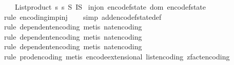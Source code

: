 \begin{isabellebody}
\ \ \ \ {\isacharparenleft}{\kern0pt}List{\isachardot}{\kern0pt}product\ {\isacharbrackleft}{\kern0pt}{}{\isachardot}{\kern0pt}{\isachardot}{\kern0pt}{\isacharless}{\kern0pt}s\ {\isacharbrackleft}{\kern0pt}{}{\isachardot}{\kern0pt}{\isachardot}{\kern0pt}{\isacharless}{\kern0pt}s\ {\isasymrightarrow}\isactrlsub S\ I\isactrlsub S{\isacharparenright}{\kern0pt}{\isacharparenright}{\kern0pt}{\isacharparenright}{\kern0pt}{\isacharparenright}{\kern0pt}{\isachardoublequoteclose}\isanewline
\isanewline
{}\isamarkupfalse%
\ {\isachardoublequoteopen}inj{\isacharunderscore}{\kern0pt}on\ encode{\isacharunderscore}{\kern0pt}f{}{\isacharunderscore}{\kern0pt}state\ {\isacharparenleft}{\kern0pt}dom\ encode{\isacharunderscore}{\kern0pt}f{}{\isacharunderscore}{\kern0pt}state{\isacharparenright}{\kern0pt}{\isachardoublequoteclose}\isanewline
%
\isadelimproof
\ \ %
\endisadelimproof
%
\isatagproof
{}\isamarkupfalse%
\ {\isacharparenleft}{\kern0pt}rule\ encoding{\isacharunderscore}{\kern0pt}imp{\isacharunderscore}{\kern0pt}inj{\isacharparenright}{\kern0pt}\isanewline
\ \ \isamarkupfalse%
\ {\isacharparenleft}{\kern0pt}simp\ add{\isacharcolon}{\kern0pt}encode{\isacharunderscore}{\kern0pt}f{}{\isacharunderscore}{\kern0pt}state{\isacharunderscore}{\kern0pt}def{\isacharparenright}{\kern0pt}\isanewline
\ \ \isamarkupfalse%
\ {\isacharparenleft}{\kern0pt}rule\ dependent{\isacharunderscore}{\kern0pt}encoding{\isacharcomma}{\kern0pt}\ metis\ nat{\isacharunderscore}{\kern0pt}encoding{\isacharparenright}{\kern0pt}\isanewline
\ \ \isamarkupfalse%
\ {\isacharparenleft}{\kern0pt}rule\ dependent{\isacharunderscore}{\kern0pt}encoding{\isacharcomma}{\kern0pt}\ metis\ nat{\isacharunderscore}{\kern0pt}encoding{\isacharparenright}{\kern0pt}\isanewline
\ \ \isamarkupfalse%
\ {\isacharparenleft}{\kern0pt}rule\ dependent{\isacharunderscore}{\kern0pt}encoding{\isacharcomma}{\kern0pt}\ metis\ nat{\isacharunderscore}{\kern0pt}encoding{\isacharparenright}{\kern0pt}\isanewline
\ \ \isamarkupfalse%
\ {\isacharparenleft}{\kern0pt}rule\ prod{\isacharunderscore}{\kern0pt}encoding{\isacharcomma}{\kern0pt}\ metis\ encode{\isacharunderscore}{\kern0pt}extensional\ list{\isacharunderscore}{\kern0pt}encoding\ zfact{\isacharunderscore}{\kern0pt}encoding{\isacharparenright}{\kern0pt}\isanewline
\ \ \isamarkupfalse%

\end{isabellebody}
